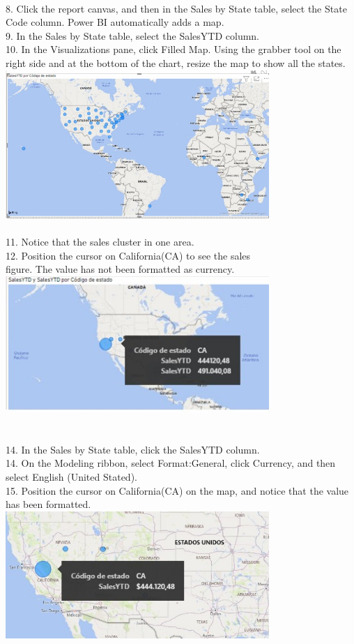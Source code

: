 \documentclass[preprint,12pt]{elsarticle}
\begin{document}
\begin{itemize}
			\\ 8. Click the report canvas, and then in the Sales by State table, select the State Code column. Power BI
			automatically adds a map.
			\\ 9. In the Sales by State table, select the SalesYTD column.
			\\ 10. In the Visualizations pane, click Filled Map. Using the grabber tool on the right side and at the bottom of
			the chart, resize the map to show all the states.
			\\ \includegraphics[width=10cm]{./IMAGENES/5.10} \\
			\\ 11. Notice that the sales cluster in one area.
			\\ 12. Position the cursor on California(CA) to see the sales \\ figure. The value has not been formatted as currency.
			\\ \includegraphics[width=10cm]{./IMAGENES/5.12} \\
			\\ \\ 14. In the Sales by State table, click the SalesYTD column.
		\\ 	14. On the Modeling ribbon, select Format:General, click Currency, and then select  English (United
			Stated).
			\\ 15. Position the cursor on California(CA) on the map, and notice that the value has been formatted.
			\\ \includegraphics[width=10cm]{./IMAGENES/5.15} \\

\end{itemize}
\end{document}

